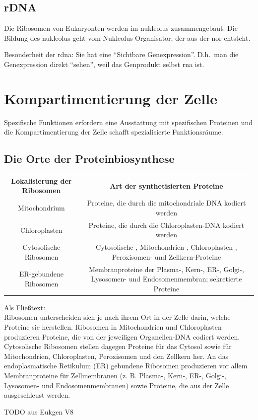 \subsection{rDNA}\label{subsec:rdna}
Die Ribosomen von Eukaryonten werden im \gls{nukleolus} zusammengebaut.
Die Bildung des \gls{nukleolus} geht vom Nukleolus‐Organisator, der aus der \gls{nor} entsteht. %


Besonderheit der \gls{rdna}: Sie hat eine ``Sichtbare Genexpression''.
D.h.\ man die Genexpression direkt ``sehen'',
weil das Genprodukt selbst \gls{rna} ist.


\section{Kompartimentierung der Zelle}\label{sec:kompartimentierung-der-zelle}
Spezifische Funktionen erfordern eine Ausstattung mit
spezifischen Proteinen und die Kompartimentierung der Zelle
schafft spezialisierte Funktionsräume. \cite{vorlesung13}

\subsection{Die Orte der Proteinbiosynthese}\label{subsec:die-orte-der-proteinbiosynthese}
\begin{mytable}
    \begin{tabular}{c|c}
        \textbf{Lokalisierung der Ribosomen} & \textbf{Art der synthetisierten Proteine} \\

        Mitochondrium
        & Proteine, die durch die mitochondriale DNA kodiert werden \\


        Chloroplasten
        & Proteine, die durch die Chloroplasten-DNA kodiert werden \\


        Cytosolische Ribosomen
        & Cytosolische-, Mitochondrien-, Chloroplasten-, Peroxisomen- und Zellkern-Proteine \\


        ER-gebundene Ribosomen
        & Membranproteine der Plasma-, Kern-, ER-, Golgi-, Lysosomen- und Endosomenmembran; sekretierte Proteine \\

    \end{tabular}
    \caption{Zusammenhang zwischen Ribosomenlokalisierung und synthetisierten Proteinen}
\end{mytable}
Als Fließtext: \\
Ribosomen unterscheiden sich je nach ihrem Ort in der Zelle darin, welche Proteine sie herstellen.
Ribosomen in Mitochondrien und Chloroplasten produzieren Proteine, die von der jeweiligen Organellen-DNA codiert werden.
Cytosolische Ribosomen stellen dagegen Proteine für das Cytosol sowie für Mitochondrien, Chloroplasten, Peroxisomen und den Zellkern her.
An das endoplasmatische Retikulum (ER) gebundene Ribosomen produzieren vor allem Membranproteine für Zellmembranen (z.
B. Plasma-, Kern-, ER-, Golgi-, Lysosomen- und Endosomenmembranen) sowie Proteine, die aus der Zelle ausgeschleust werden.

TODO aus Eukgen V8

